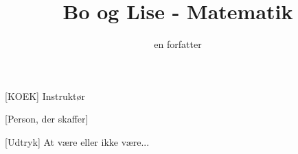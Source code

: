 \documentclass[a4paper,11pt]{article}
\title{Bo og Lise - Matematik}
\author{en forfatter}
\begin{document}
\maketitle

\begin{roles}
[KOEK] Instruktør
\end{roles}

\begin{props}
[Person, der skaffer]
\end{props}


\begin{sketch}


[Udtryk] At være eller ikke være... 



\end{sketch}
\end{document}
